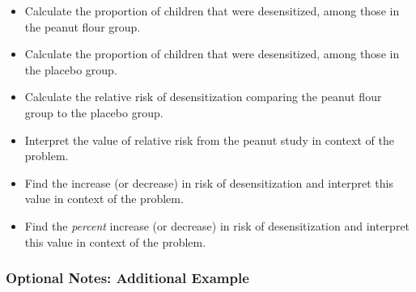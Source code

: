 \documentclass[
]{report}
\providecommand{\tightlist}{%
  \setlength{\itemsep}{0pt}\setlength{\parskip}{0pt}}
\begin{document}
\begin{itemize}
\tightlist
\item
  Calculate the proportion of children that were desensitized, among those in the peanut flour group.
\end{itemize}

\vspace{0.3in}

\begin{itemize}
\tightlist
\item
  Calculate the proportion of children that were desensitized, among those in the placebo group.
\end{itemize}

\vspace{0.3in}

\begin{itemize}
\tightlist
\item
  Calculate the relative risk of desensitization comparing the peanut flour group to the placebo group.
\end{itemize}

\vspace{0.6in}

\begin{itemize}
\tightlist
\item
  Interpret the value of relative risk from the peanut study in context of the problem.
\end{itemize}

\vspace{0.6in}

\begin{itemize}
\tightlist
\item
  Find the increase (or decrease) in risk of desensitization and interpret this value in context of the problem.
\end{itemize}

\vspace{0.8in}

\begin{itemize}
\tightlist
\item
  Find the \emph{percent} increase (or decrease) in risk of desensitization and interpret this value in context of the problem.
\end{itemize}

\vspace{0.8in}

\subsubsection*{Optional Notes: Additional Example}\label{optional-notes-additional-example-13}
\end{document}

